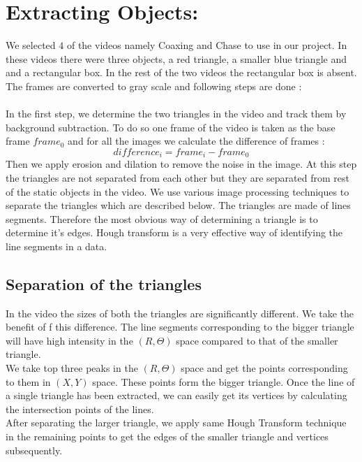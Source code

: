 \documentclass[a4paper, 10pt, notitlepage]{report}
\begin{document}
\section{Extracting Objects: }
We selected $4$ of the videos namely Coaxing and Chase to use in our project. In these videos there were three objects, a red triangle, a smaller blue triangle and and a rectangular box. In the rest of the two videos the rectangular box is absent.\\
The frames are converted to gray scale and following steps are done :\\
\\ \hspace*{10pt} In the first step, we determine the two triangles in the video and track them by background subtraction. To do so one frame of the video is taken as the base frame $frame_0$ and for all the images we calculate the difference of frames :
	$$difference_i = frame_i - frame_0$$
Then we apply erosion and dilation to remove the noise in the image. At this step the triangles are not separated from each other but they are separated from rest of the static objects in the video. We use various image processing techniques to separate the triangles which are described below.
\hspace*{10pt} The triangles are made of lines segments. Therefore the most obvious way of determining a triangle is to determine it's edges. Hough transform is a very effective way of identifying the line segments in a data.\\

\subsection{Separation of the triangles}
\hspace*{10pt} In the video the sizes of both the triangles are significantly different. We take the benefit of f this difference. The line segments corresponding to the bigger triangle will have high intensity in the $(R, \Theta)$ space compared to that of the smaller triangle.\\
\hspace*{10pt} We take top three peaks in the $(R, \Theta)$ space and get the points corresponding to them in $(X,Y)$ space. These points form the bigger triangle. Once the line of a single triangle has been extracted, we can easily get its vertices by calculating the intersection points of the lines.\\
\hspace*{10pt} After separating the larger triangle, we apply same Hough Transform technique in the remaining points to get the edges of the smaller triangle and vertices subsequently.\\
\end{document}
